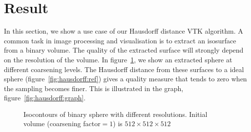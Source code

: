 \documentclass{InsightArticle}
\begin{document}
\section{Result}
%
In this section, we show a use case of our Hausdorff distance VTK algorithm. A common task in image processing and visualisation is to extract an isosurface from a binary volume. The quality of the extracted surface will strongly depend on the resolution of the volume. In figure~\ref{fig:coarse-to-fine}, we show an extracted sphere at different coarsening levels. The Hausdorff distance from these surfaces to a ideal sphere (figure~\ref{fig:hausdorff:ref}) gives a quality measure that tends to zero when the sampling becomes finer. This is illustrated in the graph, figure~\ref{fig:hausdorff:graph}.
%
\begin{figure}
 \centering
\caption{Isocontours of binary sphere with different resolutions. Initial volume (coarsening factor$ = 1$) is $512\times 512\times 512$}
\label{fig:coarse-to-fine}
\end{figure}
\end{document}
